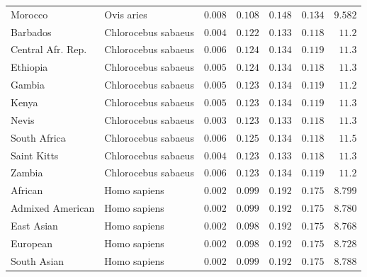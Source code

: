 \documentclass{article}
\begin{document}
\begin{center}
\begin{longtable*}{|l|l|r|r|r|r|r|}
            Morocco &          Ovis aries &               $ 0.008$ &                    $ 0.108$ &  $ 0.148$ &           $ 0.134$ &     $ 9.582$ \\
             Barbados & Chlorocebus sabaeus &               $ 0.004$ &                    $ 0.122$ &  $ 0.133$ &           $ 0.118$ &     $  11.2$ \\
             Central Afr. Rep. & Chlorocebus sabaeus &               $ 0.006$ &                    $ 0.124$ &  $ 0.134$ &           $ 0.119$ &     $  11.3$ \\
             Ethiopia & Chlorocebus sabaeus &               $ 0.005$ &                    $ 0.124$ &  $ 0.134$ &           $ 0.118$ &     $  11.3$ \\
             Gambia & Chlorocebus sabaeus &               $ 0.005$ &                    $ 0.123$ &  $ 0.134$ &           $ 0.119$ &     $  11.2$ \\
             Kenya & Chlorocebus sabaeus &               $ 0.005$ &                    $ 0.123$ &  $ 0.134$ &           $ 0.119$ &     $  11.3$ \\
             Nevis & Chlorocebus sabaeus &               $ 0.003$ &                    $ 0.123$ &  $ 0.133$ &           $ 0.118$ &     $  11.3$ \\
             South Africa  & Chlorocebus sabaeus &               $ 0.006$ &                    $ 0.125$ &  $ 0.134$ &           $ 0.118$ &     $  11.5$ \\
             Saint Kitts & Chlorocebus sabaeus &               $ 0.004$ &                    $ 0.123$ &  $ 0.133$ &           $ 0.118$ &     $  11.3$ \\
             Zambia & Chlorocebus sabaeus &               $ 0.006$ &                    $ 0.123$ &  $ 0.134$ &           $ 0.119$ &     $  11.2$ \\
            African &        Homo sapiens &               $ 0.002$ &                    $ 0.099$ &  $ 0.192$ &           $ 0.175$ &     $ 8.799$ \\
            Admixed American &        Homo sapiens &               $ 0.002$ &                    $ 0.099$ &  $ 0.192$ &           $ 0.175$ &     $ 8.780$ \\
            East Asian &        Homo sapiens &               $ 0.002$ &                    $ 0.098$ &  $ 0.192$ &           $ 0.175$ &     $ 8.768$ \\
            European &        Homo sapiens &               $ 0.002$ &                    $ 0.098$ &  $ 0.192$ &           $ 0.175$ &     $ 8.728$ \\
            South Asian &        Homo sapiens &               $ 0.002$ &                    $ 0.099$ &  $ 0.192$ &           $ 0.175$ &     $ 8.788$ \\
        \end{longtable*}
    \end{center}
\end{document}
